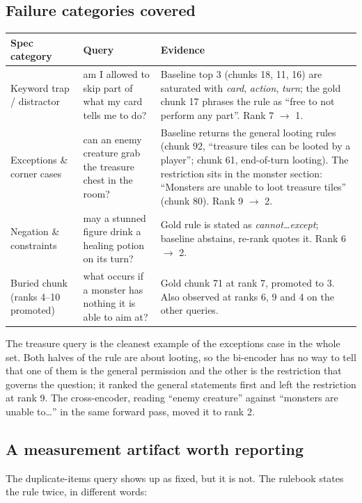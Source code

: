 \documentclass[11pt,a4paper]{article}
\begin{document}
\subsection{Failure categories covered}

\begin{tabular}{p{3.2cm}p{7.2cm}p{3.4cm}}
\toprule
Spec category & Query & Evidence \\
\midrule
Keyword trap / distractor &
am I allowed to skip part of what my card tells me to do? &
Baseline top 3 (chunks 18, 11, 16) are saturated with \emph{card}, \emph{action},
\emph{turn}; the gold chunk 17 phrases the rule as ``free to not perform any part''.
Rank 7 $\rightarrow$ 1. \\
\addlinespace
Exceptions \& corner cases &
can an enemy creature grab the treasure chest in the room? &
Baseline returns the general looting rules (chunk 92, ``treasure tiles can be
looted by a player''; chunk 61, end-of-turn looting). The restriction sits in the
monster section: ``Monsters are unable to loot treasure tiles'' (chunk 80).
Rank 9 $\rightarrow$ 2. \\
\addlinespace
Negation \& constraints &
may a stunned figure drink a healing potion on its turn? &
Gold rule is stated as \emph{cannot\ldots except}; baseline abstains, re-rank
quotes it. Rank 6 $\rightarrow$ 2. \\
\addlinespace
Buried chunk (ranks 4--10 promoted) &
what occurs if a monster has nothing it is able to aim at? &
Gold chunk 71 at rank 7, promoted to 3. Also observed at ranks 6, 9 and 4 on the
other queries. \\
\bottomrule
\end{tabular}

\medskip
The treasure query is the cleanest example of the exceptions case in the whole set. Both
halves of the rule are about looting, so the bi-encoder has no way to tell that one of them
is the general permission and the other is the restriction that governs the question; it
ranked the general statements first and left the restriction at rank 9. The cross-encoder,
reading ``enemy creature'' against ``monsters are unable to\ldots'' in the same forward
pass, moved it to rank 2.

\subsection{A measurement artifact worth reporting}

The duplicate-items query shows up as fixed, but it is not. The rulebook states the rule
twice, in different words:
\end{document}
